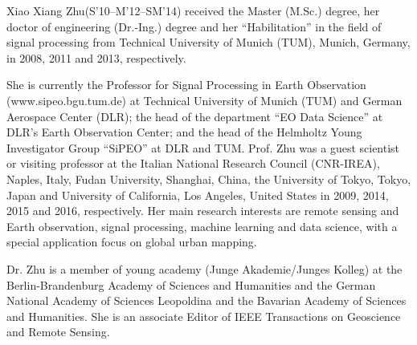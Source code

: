 \documentclass[journal]{IEEEtran}
\begin{document}
\begin{IEEEbiography}{Xiao Xiang Zhu}(S'10--M'12--SM'14) received the Master (M.Sc.) degree, her doctor of engineering (Dr.-Ing.) degree and her “Habilitation” in the field of signal processing from Technical University of Munich (TUM), Munich, Germany, in 2008, 2011 and 2013, respectively.
\par
  She is currently the Professor for Signal Processing in Earth Observation (www.sipeo.bgu.tum.de) at Technical University of Munich (TUM) and German Aerospace Center (DLR); the head of the department ``EO Data Science'' at DLR's Earth Observation Center; and the head of the Helmholtz Young Investigator Group ``SiPEO'' at DLR and TUM. Prof. Zhu was a guest scientist or visiting professor at the Italian National Research Council (CNR-IREA), Naples, Italy, Fudan University, Shanghai, China, the University  of Tokyo, Tokyo, Japan and University of California, Los Angeles, United States in 2009, 2014, 2015 and 2016, respectively. Her main research interests are
  remote sensing and Earth observation, signal processing, machine learning and data science, with a special application focus on global urban mapping.

  Dr. Zhu is a member of young academy (Junge Akademie/Junges Kolleg) at the Berlin-Brandenburg Academy of Sciences and Humanities and the German National  Academy of Sciences Leopoldina and the Bavarian Academy of Sciences and Humanities. She is an associate Editor of IEEE Transactions on Geoscience and Remote Sensing.
  \end{IEEEbiography}
\end{document}
